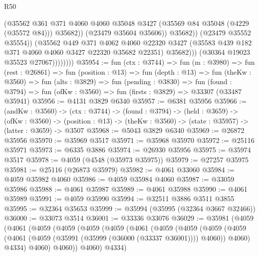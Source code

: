 \begin{lexlean}{R50}
\begin{coremodule}
                                (@35562
                                  @361
                                  @371
                                  @4060
                                  @4060
                                  @35048
                                  @3427
                                  (@35569 @84 @35048 (@4229 (@35572 @84)))
                                  @35682))
                              (@23479 @35604 @35606))
                            @35682))
                        (@23479 @35552 @35554))
                      (@35562
                        @449
                        @371
                        @4062
                        @4060
                        @22320
                        @3427
                        (@35583 @439 @182 @371 @4060 @4060 @3427 @22320 @35682 @22351)
                        @35682)))
                  (@30364 @19023 @35523 @27067))))))))
@35954 := fun (ctx : @3744) =>
  fun (m : @3980) =>
  fun (rest : @26861) =>
  fun (position : @13) =>
  fun (depth : @13) =>
  fun (theKw : @3560) =>
  fun (alts : @3829) =>
  fun (pending : @3830) =>
  fun (found : @3794) => fun (ofKw : @3560) => fun (firsts : @3829) => @33307 (@33487 @35941)
@35956 := @4131 @3829 @6340
@35957 := @6381 @35956
@35966 := (andKw : @3560) ->
  (ctx : @3744) ->
  (found : @3794) ->
  (held : @3659) ->
  (ofKw : @3560) ->
  (position : @13) -> (theKw : @3560) -> (state : @35957) -> (latter : @3659) -> @3507
@35968 := @5043 @3829 @6340
@35969 := @26872 @35956
@35970 := @35969 @3517
@35971 := @35968 @35970
@35972 := @25116 @35971
@35973 := @6335 @3886
@35974 := @26930 @35956
@35975 := @35974 @3517
@35978 := @4059 (@4548 (@35973 @35975))
@35979 := @27257 @35975
@35981 := @25116 (@26873 @35979)
@35982 := @4061 @33060
@35984 := @4059 @35982 @4060
@35986 := @4059 @35984 @4060
@35987 := @33059 @35986
@35988 := @4061 @35987
@35989 := @4061 @35988
@35990 := @4061 @35989
@35991 := @4059 @35990
@35994 := @32511 @3886 @3511 @3855
@35995 := @32364 @35653
@35999 := @35994 (@35995 (@32364 @3667 @32466))
@36000 := @33073 @3514
@36001 := @33336 @33076
@36029 := @35981
    (@4059
      (@4061
        (@4059
          (@4059
            (@4059
              (@4059
                (@4061
                  (@4059
                    (@4059
                      (@4059
                        (@4059
                          (@4061 (@4059 (@35991 (@35999 (@36000 (@33337 @36001)))) @4060))
                          @4060)
                        @4334)
                      @4060)
                    @4060))
                @4060)
              @4334)

\end{coremodule}
\end{lexlean}
